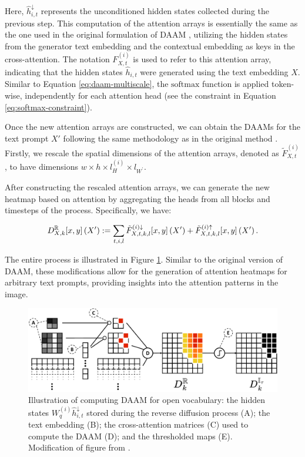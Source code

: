 Here, $\hat{h}_{i, t}^{\downarrow}$ represents the unconditioned hidden states collected during the previous step. This computation of the attention arrays is essentially the same as the one used in the original formulation of DAAM \cite{DAAM}, utilizing the hidden states from the generator text embedding and the contextual embedding as keys in the cross-attention.
The notation $F_{X,t}^{(i)}$ is used to refer to this attention array, indicating that the hidden states $\hat{h}_{i,t}$ were generated using the text embedding $X$. Similar to Equation \ref{eq:daam-multiscale}, the $\text{softmax}$ function is applied token-wise, independently for each attention head (see the constraint in Equation \ref{eq:softmax-constraint}).

Once the new attention arrays are constructed, we can obtain the DAAMs for the text prompt $X'$ following the same methodology as in the original method \cite{DAAM}. Firstly, we rescale the spatial dimensions of the attention arrays, denoted as $\tilde{F}_{X,t}^{(i)}$, to have dimensions $w \times h \times l_{H}^{(i)} \times l_{W^\prime}$.

After constructing the rescaled attention arrays, we can generate the new heatmap based on attention by aggregating the heads from all blocks and timesteps of the process. Specifically, we have:

\begin{equation}
\label{eq:daam-summing-ov}
    D_{X,k}^{\mathbb{R}}[x, y] \left ( X^\prime \right ) := \sum_{t, i, l} \Tilde{F}_{X, t, k, l}^{(i) \downarrow}[x,y]\left ( X^\prime \right ) + \Tilde{F}_{X, t, k, l}^{(i) \uparrow}[x,y]\left ( X^\prime \right ).
\end{equation}


The entire process is illustrated in Figure \ref{fig:daam-ov-diagram}. Similar to the original version of DAAM, these modifications allow for the generation of attention heatmaps for arbitrary text prompts, providing insights into the attention patterns in the image.

  \begin{figure}
    \centering
    \includegraphics[width=1\columnwidth]{img/3-methodology/diagram-ov-daam.pdf}
    \caption[Illustration of computing DAAM for open
vocabulary]{Illustration of computing DAAM for open vocabulary: the hidden states $W_{q}^{(i)}\hat{h}_{i,t}^{\downarrow}$ stored during the reverse diffusion process (A); the text embedding (B); the cross-attention matrices (C) used to compute the DAAM (D); and the thresholded maps (E). Modification of figure from \cite{DAAM}.}
    \label{fig:daam-ov-diagram}
\end{figure}



